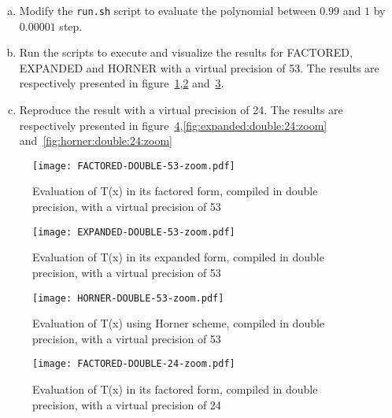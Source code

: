 \begin{question}
  \begin{enumerate}[(a)]
    \item Modify the {\tt run.sh} script to evaluate the  polynomial between $0.99$ and $1$ by $0.00001$ step.
  \item Run the scripts to execute and visualize the results for
    FACTORED, EXPANDED and HORNER with a virtual precision of 53. The results are respectively presented in figure~\ref{fig:factored:double:53:zoom},\ref{fig:expanded:double:53:zoom}
    and~\ref{fig:horner:double:53:zoom}.

\item Reproduce the result with a virtual precision of 24. The results are respectively presented in figure~\ref{fig:factored:double:24:zoom},\ref{fig:expanded:double:24:zoom}
    and~\ref{fig:horner:double:24:zoom}

\end{enumerate}
\end{question}

\begin{figure}[h]
  \center \texttt{[image: FACTORED-DOUBLE-53-zoom.pdf]}
  \caption{Evaluation of T(x) in its factored form, compiled in double
    precision, with a virtual precision of 53}
  \label{fig:factored:double:53:zoom}
\end{figure}

\begin{figure}[h]
  \center \texttt{[image: EXPANDED-DOUBLE-53-zoom.pdf]}
  \caption{Evaluation of T(x) in its expanded form, compiled in double
    precision, with a virtual precision of 53}
  \label{fig:expanded:double:53:zoom}
\end{figure}

\begin{figure}[h]
  \center \texttt{[image: HORNER-DOUBLE-53-zoom.pdf]}
  \caption{Evaluation of T(x) using Horner scheme, compiled in double precision,
    with a virtual precision of 53}
  \label{fig:horner:double:53:zoom}
\end{figure}

\begin{figure}[h]
  \center \texttt{[image: FACTORED-DOUBLE-24-zoom.pdf]}
  \caption{Evaluation of T(x) in its factored form, compiled in double
    precision, with a virtual precision of 24}
  \label{fig:factored:double:24:zoom}
\end{figure}


